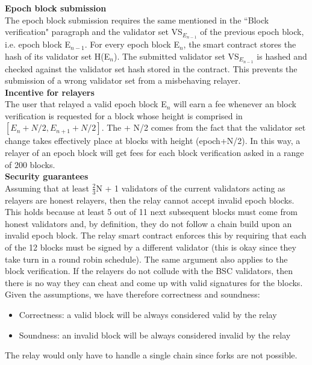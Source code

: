 \noindent
\textbf{Epoch block submission}\\
The epoch block submission requires the same \rlph mentioned in the ``Block verification" paragraph and the validator set VS$_{E_{n-1}}$ of the previous epoch block, i.e. epoch block E$_{n-1}$. For every epoch block E$_{n}$, the smart contract stores the hash of its validator set H(E$_{n}$). The submitted validator set VS$_{E_{n-1}}$ is hashed and checked against the validator set hash stored in the contract. This prevents the submission of a wrong validator set from a misbehaving relayer.\\ %


\noindent
\textbf{Incentive for relayers}\\
The user that relayed a valid epoch block E$_n$ will earn a fee whenever an block verification is requested for a block whose height is comprised in $[E_n + N/2, E_{n+1} + N/2]$. The + N/2 comes from the fact that the validator set change takes effectively place at blocks with height (epoch+N/2). In this way, a relayer of an epoch block will get fees for each block verification asked in a range of 200 blocks.\\


\noindent
\textbf{Security guarantees}\\
Assuming that at least $\frac{2}{3}$N + 1 validators of the current validators acting as relayers are honest relayers, then the relay cannot accept invalid epoch blocks. This holds because at least 5 out of 11 next subsequent blocks must come from honest validators and, by definition, they do not follow a chain build upon an invalid epoch block. The relay smart contract enforces this by requiring that each of the 12 blocks must be signed by a different validator (this is okay since they take turn in a round robin schedule). The same argument also applies to the block verification. If the relayers do not collude with the BSC validators, then there is no way they can cheat and come up with valid signatures for the blocks. Given the assumptions, we have therefore correctness and soundness:
\begin{itemize}
	\item Correctness: a valid block will be always considered valid by the relay
	\item Soundness: an invalid block will be always considered invalid by the relay
\end{itemize}
The relay would only have to handle a single chain since forks are not possible.\\  

